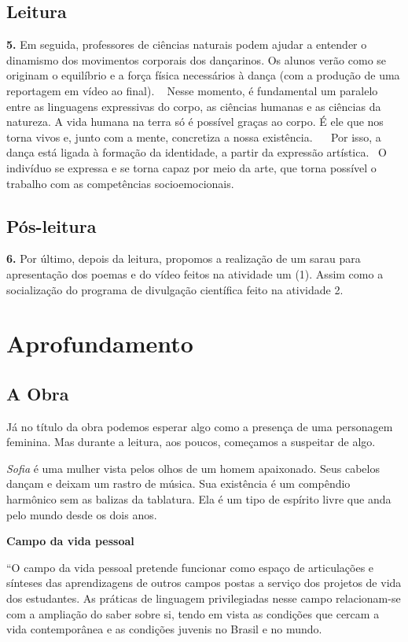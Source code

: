 \documentclass[12pt]{extarticle}
\begin{document}
\subsection{Leitura}

\textbf{5.} Em seguida, professores de ciências naturais podem ajudar a
entender o dinamismo dos movimentos corporais dos dançarinos. Os alunos verão
como se originam o equilíbrio e a força física necessários à dança (com a
produção de uma reportagem em vídeo ao final).    Nesse momento, é fundamental
um paralelo entre as linguagens expressivas do corpo, as ciências humanas e as
ciências da natureza. A vida humana na terra só é possível graças ao corpo. É
ele que nos torna vivos e, junto com a mente, concretiza a nossa existência.   
Por isso, a dança está ligada à formação da identidade, a partir da expressão
artística.  O indivíduo se expressa e se torna capaz por meio da arte, que
torna possível o trabalho com as competências socioemocionais.


\subsection{Pós-leitura}

\textbf{6.} Por último, depois da leitura, propomos a realização de um sarau
para apresentação dos poemas e do vídeo feitos na atividade um (1). Assim como
a socialização do programa de divulgação científica feito na atividade 2.

\section{Aprofundamento}


\subsection{A Obra}

Já no título da obra podemos esperar algo como a presença de uma personagem
feminina. Mas durante a leitura, aos poucos, começamos a suspeitar de algo.

\textit{Sofia} é uma mulher vista pelos olhos de um homem apaixonado. Seus cabelos
dançam e deixam um rastro de música. Sua existência é um compêndio harmônico
sem as balizas da tablatura. Ela é um tipo de espírito livre que anda pelo
mundo desde os dois anos.


\textbf{Campo da vida pessoal}

``O campo da vida pessoal pretende funcionar como espaço de articulações
e sínteses das aprendizagens de outros campos postas a serviço dos
projetos de vida dos estudantes. As práticas de linguagem privilegiadas
nesse campo relacionam-se com a ampliação do saber sobre si, tendo em
vista as condições que cercam a vida contemporânea e as condições
juvenis no Brasil e no mundo.
\end{document}
